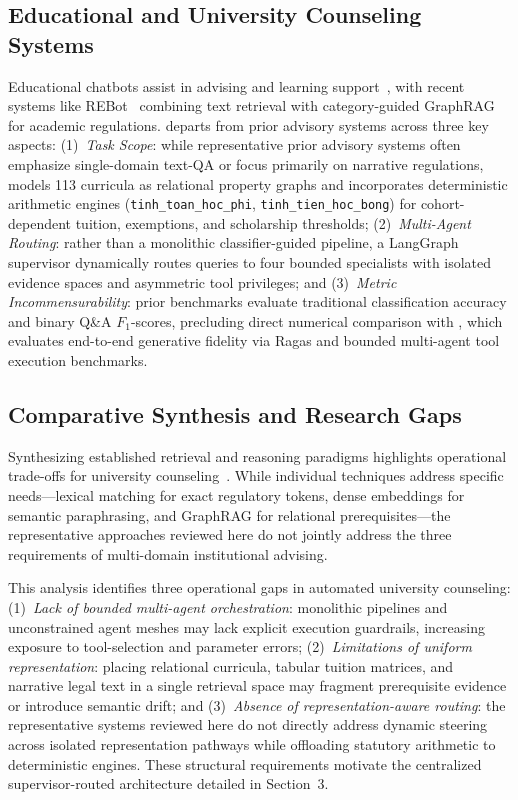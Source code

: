 \subsection{Educational and University Counseling Systems}
\label{sec:educational_counseling}

Educational chatbots assist in advising and learning support~\cite{wollny2021chatbots}, with recent systems like REBot~\cite{ma2025rebot} combining text retrieval with category-guided GraphRAG for academic regulations. \system{} departs from prior advisory systems across three key aspects: (1)~\emph{Task Scope}: while representative prior advisory systems often emphasize single-domain text-QA or focus primarily on narrative regulations, \system{} models 113 curricula as relational property graphs and incorporates deterministic arithmetic engines (\texttt{tinh\_toan\_hoc\_phi}, \texttt{tinh\_tien\_hoc\_bong}) for cohort-dependent tuition, exemptions, and scholarship thresholds; (2)~\emph{Multi-Agent Routing}: rather than a monolithic classifier-guided pipeline, a LangGraph supervisor dynamically routes queries to four bounded specialists with isolated evidence spaces and asymmetric tool privileges; and (3)~\emph{Metric Incommensurability}: prior benchmarks evaluate traditional classification accuracy and binary Q\&A $F_1$-scores, precluding direct numerical comparison with \system{}, which evaluates end-to-end generative fidelity via Ragas and bounded multi-agent tool execution benchmarks.

\subsection{Comparative Synthesis and Research Gaps}
\label{sec:gaps}

Synthesizing established retrieval and reasoning paradigms highlights operational trade-offs for university counseling~\cite{cormack2009rrf,edge2024graphrag,jeong2024adaptiverag,karpukhin2020dpr,robertson2009bm25,schick2023toolformer,wu2023autogen,yao2023react}. While individual techniques address specific needs---lexical matching for exact regulatory tokens, dense embeddings for semantic paraphrasing, and GraphRAG for relational prerequisites---the representative approaches reviewed here do not jointly address the three requirements of multi-domain institutional advising.

This analysis identifies three operational gaps in automated university counseling: (1)~\emph{Lack of bounded multi-agent orchestration}: monolithic pipelines and unconstrained agent meshes may lack explicit execution guardrails, increasing exposure to tool-selection and parameter errors; (2)~\emph{Limitations of uniform representation}: placing relational curricula, tabular tuition matrices, and narrative legal text in a single retrieval space may fragment prerequisite evidence or introduce semantic drift; and (3)~\emph{Absence of representation-aware routing}: the representative systems reviewed here do not directly address dynamic steering across isolated representation pathways while offloading statutory arithmetic to deterministic engines. These structural requirements motivate the centralized supervisor-routed architecture detailed in Section~3.
